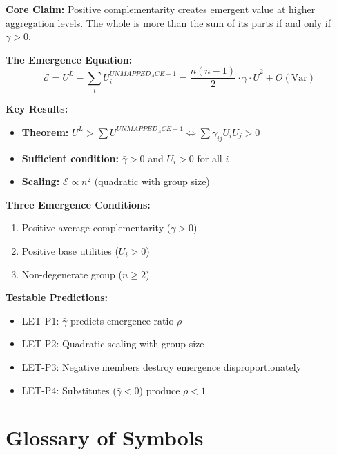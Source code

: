 \begin{tcolorbox}[colback=green!10!white, colframe=green!75!black,
    title=\textbf{Appendix UNMAPPED_LET Summary: The Level Emergence Theorem}]

\textbf{Core Claim:}
Positive complementarity creates emergent value at higher aggregation levels.
The whole is more than the sum of its parts if and only if $\bar{\gamma} > 0$.

\textbf{The Emergence Equation:}
\begin{equation*}
\mathcal{E} = U^L - \sum_i U^{UNMAPPED_ACE-1}_i = \frac{n(n-1)}{2} \cdot \bar{\gamma} \cdot \bar{U}^2 + O(\text{Var})
\end{equation*}

\textbf{Key Results:}
\begin{itemize}[nosep]
\item \textbf{Theorem:} $U^L > \sum U^{UNMAPPED_ACE-1} \Leftrightarrow \sum \gamma_{ij} U_i U_j > 0$
\item \textbf{Sufficient condition:} $\bar{\gamma} > 0$ and $U_i > 0$ for all $i$
\item \textbf{Scaling:} $\mathcal{E} \propto n^2$ (quadratic with group size)
\end{itemize}

\textbf{Three Emergence Conditions:}
\begin{enumerate}[nosep]
\item Positive average complementarity ($\bar{\gamma} > 0$)
\item Positive base utilities ($U_i > 0$)
\item Non-degenerate group ($n \geq 2$)
\end{enumerate}

\textbf{Testable Predictions:}
\begin{itemize}[nosep]
\item LET-P1: $\bar{\gamma}$ predicts emergence ratio $\rho$
\item LET-P2: Quadratic scaling with group size
\item LET-P3: Negative members destroy emergence disproportionately
\item LET-P4: Substitutes ($\bar{\gamma} < 0$) produce $\rho < 1$
\end{itemize}

\end{tcolorbox}


\section{Glossary of Symbols}

